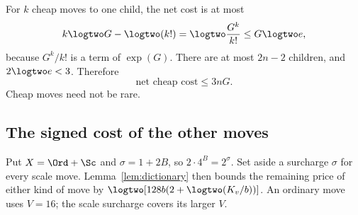 For $k$ cheap moves to one child, the net cost is at most
\[
      k\logtwo G-\logtwo(k!)=\logtwo\frac{G^k}{k!}
                          \leq G\logtwo e,
\]
because $G^k/k!$ is a term of $\exp(G)$.
There are at most $2n-2$ children, and $2\logtwo e<3$. Therefore
\begin{equation}
                     \text{net cheap cost}\leq3nG.
\label{eq:cheap}
\end{equation}
Cheap moves need not be rare.

\subsection{The signed cost of the other moves}
\label{sec:signed}

Put $X=\Ord+\Sc$ and $\sigma=1+2B$, so $2\cdot4^B=2^\sigma$.
Set aside a surcharge $\sigma$ for every scale move. Lemma~\ref{lem:dictionary}
then bounds the remaining price of either kind of move by
$\logtwo[128b(2+\logtwo(K_v/b))]$. An ordinary move uses $V=16$;
the scale surcharge covers its larger $V$.

